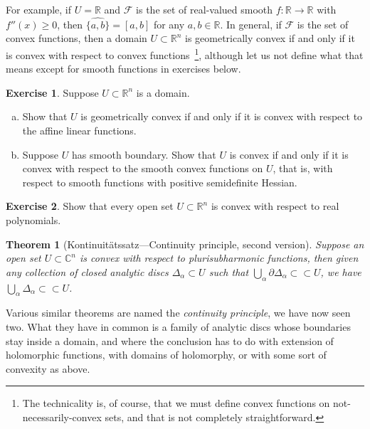 \documentclass[12pt,openany]{book}
\newcommand{\C}{{\mathbb{C}}}
\newcommand{\R}{{\mathbb{R}}}
\newcommand{\sF}{{\mathscr{F}}}
\theoremstyle{plain}
\newtheorem{thm}{Theorem}[section]
\theoremstyle{remark}
\theoremstyle{definition}
\newenvironment{exbox}{%
    \def\FrameCommand{\vrule width 1pt \relax\hspace{10pt}}%
    \MakeFramed{\advance\hsize-\width\FrameRestore}%
}{%
    \endMakeFramed
}
\newenvironment{exparts}{%
    \leavevmode\begin{enumerate}[a),noitemsep,topsep=0pt,parsep=0pt,partopsep=0pt]
}{%
    \end{enumerate}
}
\theoremstyle{exercise}
\newtheorem{exercise}{Exercise}[section]
\theoremstyle{example}
\begin{document}
For example, if $U=\R$ and $\sF$ is the set of real-valued smooth
$f \colon \R \to \R$ with $f''(x) \geq 0$, then
$\widehat{\{ a, b \}} = [a,b]$ for any $a,b \in \R$.
In general, if $\sF$ is the set of convex functions, then
a domain $U \subset \R^n$ is geometrically convex if and only if it is
convex with respect to convex functions~\footnote{%
The technicality is, of course, that we must define convex functions on
not-necessarily-convex sets, and that is not completely straightforward.},
although let us not define
what that means except for smooth functions in exercises below.

\begin{exbox}
\begin{exercise} \label{exercise:geomconvexfuncs}
Suppose $U \subset \R^n$ is a domain.
\begin{exparts}
\item
Show that $U$
is geometrically convex if and only if it is
convex with respect to the affine linear functions.
\item
Suppose $U$
has smooth boundary.
Show that $U$ is
convex if and only if it is
convex with respect to the smooth convex functions on $U$,
that is, with respect to smooth functions with positive semidefinite Hessian.
\end{exparts}
\end{exercise}

\begin{exercise}
Show that every open set $U \subset \R^n$ is convex with respect to real
polynomials.
\end{exercise}
\end{exbox}

\begin{thm}[Kontinuit\"atssatz---Continuity
principle, second version]
\label{thm:contprinciple2}
Suppose an open set $U \subset \C^n$ is convex with respect to plurisubharmonic
functions,
then given any collection of closed analytic discs $\Delta_\alpha \subset U$
such that $\bigcup_\alpha \partial \Delta_\alpha \subset \subset U$,
we have
$\bigcup_\alpha \Delta_\alpha \subset \subset U$.
\end{thm}

Various similar theorems are named the \emph{continuity principle},
we have now seen two.
What they have in common is a family of analytic discs whose
boundaries stay inside a domain, and where the conclusion has to do
with extension of holomorphic functions, with domains of holomorphy, or
with some sort of convexity as above.
\end{document}
